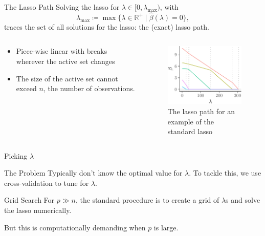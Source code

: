 \begin{frame}{The Lasso Path}
  Solving the lasso for \(\lambda \in [0, \lambda_\text{max})\), with
  \[\lambda_\text{max} \coloneqq \max \big\{ \lambda \in \mathbb{R}^+ \mid
  \hat\beta(\lambda) = 0\big\},\]
  traces the set of all solutions for the lasso:
  the (exact) lasso path. \medskip

  \pause

  \begin{columns}[T, onlytextwidth]
    \begin{column}{0.5\linewidth}
      \begin{itemize}
        \item Piece-wise linear with breaks wherever the
          active set changes \medskip
        \item The size of the active set cannot exceed \(n\), the number of
          observations.
      \end{itemize}
    \end{column} 
    \begin{column}{0.5\linewidth}
      \begin{figure}
        \includegraphics{figures/lasso-path}
        \caption{The lasso path for an example of the standard lasso}
      \end{figure}
    \end{column}
  \end{columns}

\end{frame}

\begin{frame}{Picking \(\lambda\)}

  \begin{block}{The Problem}
    Typically don't know the optimal value for
    \(\lambda\). To tackle this, we use cross-validation to tune for
      \(\lambda\).
  \end{block}

  \pause

  \begin{block}{Grid Search}
    For \(p \gg n\), the standard procedure is to create a
    grid of \(\lambda\)s and solve the lasso numerically.
  \end{block}

  \medskip

  \pause

  But this is computationally demanding when \(p\) is large.
  
\end{frame}

